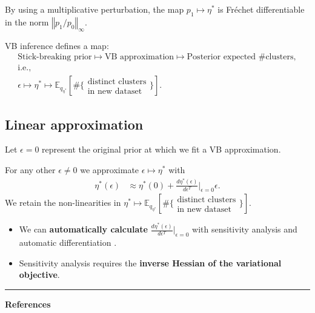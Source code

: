 \documentclass[a0,plainsections,30pt]{sciposter}\usepackage[]{graphicx}\usepackage[]{color}
\newcommand{\Expect}{\mathbb{E}}
\newcommand{\etaopt}{\eta^{*}}
\newcommand{\targetexpectation}{\Expect_{q_{\eta^*}}
\left[\#\{\substack{\text{distinct clusters}\\\text{in new dataset}}\} \right]}
\begin{document}
\begin{minipage}[t]{0.45\textwidth}
By using a multiplicative perturbation, the map $p_1 \mapsto \etaopt$ is
Fr\'{e}chet differentiable in the norm $\left\Vert p_1 / p_0
\right\Vert_\infty$.

\begin{mdframed}[style=MyFrame]
VB inference defines a map:
%
\begin{gather*}
\textrm{Stick-breaking prior}
    \mapsto \textrm{VB approximation}
    \mapsto \textrm{Posterior expected \# clusters},\\
\textrm{i.e.,}\\
\epsilon
    \mapsto \etaopt
    \mapsto \targetexpectation.
\end{gather*}
\end{mdframed}


\vspace{-0.9in}
\subsection*{Linear approximation}
\vspace{-0.2in}
Let $\epsilon=0$ represent the original prior at which we fit a VB
approximation.

\begin{mdframed}[style=MyFrame]
For any other $\epsilon \ne 0$ we approximate $\epsilon \mapsto \etaopt$ with
\begin{align*}
\eta^*(\epsilon)  &\approx  \eta^*(0) +
\frac{d \eta^*(\epsilon)}{d\epsilon^T}\Big|_{\epsilon=0} \epsilon.
\label{eq:linear_approx}
\end{align*}
We retain the non-linearities in $\etaopt \mapsto \targetexpectation$.
\end{mdframed}

\begin{itemize}
\item We can \textbf{automatically calculate}
    $\frac{d \eta^*(\epsilon)}{d\epsilon^T}\Big|_{\epsilon=0}$
    with sensitivity analysis and automatic differentiation
    \cite{giordano:2017:covariances, maclaurin:2015:autograd}.
\item Sensitivity analysis requires the
    \textbf{inverse Hessian of the variational objective}.
\end{itemize}

\begin{center}
\noindent\rule{0.95\textwidth}{1pt}
\end{center}
{\bf References}
\renewcommand{\section}[2]{}%
\footnotesize{
  
  
}

\end{minipage}
\end{document}
